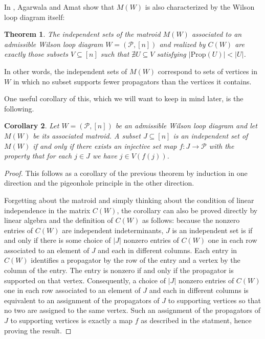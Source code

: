 \documentclass[11pt]{article}
\newcommand{\cP}{\mathcal{P}}
\newcommand{\Prop}{\textrm{Prop}}
\newtheorem{thm}{Theorem}[section]
\newtheorem{cor}[thm]{Corollary}
\theoremstyle{remark}
\theoremstyle{definition}
\begin{document}
In \cite{wilsonloop}, Agarwala and Amat show that $M(W)$ is also characterized by the Wilson loop diagram itself:

\begin{thm} \label{thm WLD defines matroid} \cite[Theorem 3.6]{wilsonloop} The independent sets of the matroid $M(W)$ associated to an admissible Wilson loop diagram $W = (\cP,[n])$ and realized by $C(W)$ are exactly those subsets $V \subseteq [n]$ such that $\nexists U\subseteq V$ satisfying $|\Prop(U)| < |U|$. \end{thm}
In other words, the independent sets of $M(W)$ correspond to sets of vertices in $W$ in which no subset supports fewer propagators than the vertices it contains.

One useful corollary of this, which we will want to keep in mind later, is the following.
\begin{cor}\label{lem basis as perm}
Let $W = (\cP,[n])$ be an admissible Wilson loop diagram and let $M(W)$ be its associated matroid. A subset $J \subseteq [n]$ is an independent set of $M(W)$ if and only if there exists an injective set map $f : J \rightarrow \cP$ with the property that for each $j\in J$ we have $j \in V(f(j))$.
\end{cor}

\begin{proof}
  This follows as a corollary of the previous theorem by induction in one direction and the pigeonhole principle in the other direction.  

Forgetting about the matroid and simply thinking about the condition of linear independence in the matrix $C(W)$, the corollary can also be proved directly by linear algebra and the definition of $C(W)$ as follows: because the nonzero entries of $C(W)$ are independent indeterminants, $J$ is an independent set is if and only if there is some choice of $|J|$ nonzero entries of $C(W)$ one in each row associated to an element of $J$ and each in different columns. Each entry in $C(W)$ identifies a propagator by the row of the entry and a vertex by the column of the entry.  The entry is nonzero if and only if the propagator is supported on that vertex.  Consequently, a choice of $|J|$ nonzero entries of $C(W)$ one in each row associated to an element of $J$ and each in different columns is equivalent to an assignment of the propagators of $J$ to supporting vertices so that no two are assigned to the same vertex.  Such an assignment of the propagators of $J$ to supporting vertices is exactly a map $f$ as described in the statment, hence proving the result.
\end{proof}
\end{document}
